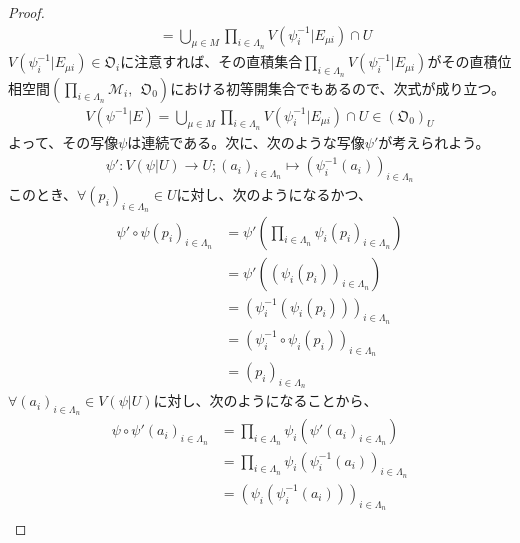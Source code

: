 \documentclass[dvipdfmx]{jsarticle}
\begin{document}
\begin{proof}
\begin{align*}
&= \bigcup_{\mu \in M} {\prod_{i \in \varLambda_{n}} {V\left( \psi_{i}^{- 1}|E_{\mu i} \right)}} \cap U
\end{align*}
$V\left( \psi_{i}^{- 1}|E_{\mu i} \right) \in \mathfrak{O}_{i}$に注意すれば、その直積集合$\prod_{i \in \varLambda_{n}} {V\left( \psi_{i}^{- 1}|E_{\mu i} \right)}$がその直積位相空間$\left( \prod_{i \in \varLambda_{n}} \mathcal{M}_{i},\ \ \mathfrak{O}_{0} \right)$における初等開集合でもあるので、次式が成り立つ。
\begin{align*}
V\left( \psi^{- 1}|E \right) = \bigcup_{\mu \in M} {\prod_{i \in \varLambda_{n}} {V\left( \psi_{i}^{- 1}|E_{\mu i} \right)}} \cap U \in \left( \mathfrak{O}_{0} \right)_{U}
\end{align*}
よって、その写像$\psi$は連続である。次に、次のような写像$\psi'$が考えられよう。
\begin{align*}
\psi':V\left( \psi|U \right) \rightarrow U;\left( a_{i} \right)_{i \in \varLambda_{n}} \mapsto \left( \psi_{i}^{- 1}\left( a_{i} \right) \right)_{i \in \varLambda_{n}}
\end{align*}
このとき、$\forall\left( p_{i} \right)_{i \in \varLambda_{n}} \in U$に対し、次のようになるかつ、
\begin{align*}
\psi' \circ \psi\left( p_{i} \right)_{i \in \varLambda_{n}} &= \psi'\left( \prod_{i \in \varLambda_{n}} \psi_{i}\left( p_{i} \right)_{i \in \varLambda_{n}} \right)\\
&= \psi'\left( \left( \psi_{i}\left( p_{i} \right) \right)_{i \in \varLambda_{n}} \right)\\
&= \left( \psi_{i}^{- 1}\left( \psi_{i}\left( p_{i} \right) \right) \right)_{i \in \varLambda_{n}}\\
&= \left( \psi_{i}^{- 1} \circ \psi_{i}\left( p_{i} \right) \right)_{i \in \varLambda_{n}}\\
&= \left( p_{i} \right)_{i \in \varLambda_{n}}
\end{align*}
$\forall\left( a_{i} \right)_{i \in \varLambda_{n}} \in V\left( \psi|U \right)$に対し、次のようになることから、
\begin{align*}
\psi \circ \psi'\left( a_{i} \right)_{i \in \varLambda_{n}} &= \prod_{i \in \varLambda_{n}} \psi_{i}\left( \psi'\left( a_{i} \right)_{i \in \varLambda_{n}} \right)\\
&= \prod_{i \in \varLambda_{n}} \psi_{i}\left( \psi_{i}^{- 1}\left( a_{i} \right) \right)_{i \in \varLambda_{n}}\\
&= \left( \psi_{i}\left( \psi_{i}^{- 1}\left( a_{i} \right) \right) \right)_{i \in \varLambda_{n}}\\

\end{align*}
\end{proof}
\end{document}
